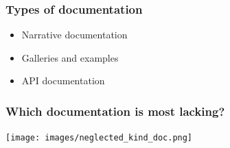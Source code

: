 \documentclass[xcolor=dvipsnames]{beamer}
\begin{document}
\begin{frame}
\frametitle{Types of documentation}
\begin{overlayarea}{12cm}{3cm}
\begin{itemize}[label={$\bullet$}]
\item<1-> Narrative documentation
\item<2-> Galleries and examples
\item<3-> API documentation
\end{itemize}

\end{overlayarea}
\begin{overlayarea}{12cm}{6cm}
\begin{center}
\end{center}
\end{overlayarea}
\end{frame}

\begin{frame}
\frametitle{Which documentation is most lacking?}
\begin{center}
\texttt{[image: images/neglected\_kind\_doc.png]}
\end{center}
\end{frame}
\end{document}
